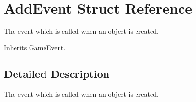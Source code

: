 \hypertarget{struct_add_event}{\section{Add\-Event Struct Reference}
\label{struct_add_event}
}


The event which is called when an object is created.  




Inherits Game\-Event.



\subsection{Detailed Description}
The event which is called when an object is created. 

